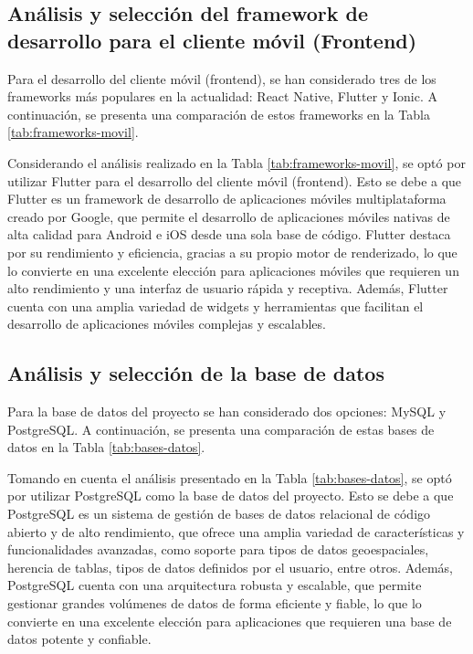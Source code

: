 \subsection{Análisis y selección del framework de desarrollo para el cliente móvil (Frontend)}

Para el desarrollo del cliente móvil (frontend), se han considerado tres de los frameworks más populares en la
actualidad: React Native, Flutter y Ionic. A continuación, se presenta una comparación de estos frameworks en la
Tabla \ref{tab:frameworks-movil}.



Considerando el análisis realizado en la Tabla \ref{tab:frameworks-movil}, se optó por utilizar Flutter para el
desarrollo del cliente móvil (frontend). Esto se debe a que Flutter es un framework de desarrollo de aplicaciones
móviles multiplataforma creado por Google, que permite el desarrollo de aplicaciones móviles nativas de alta
calidad para Android e iOS desde una sola base de código. Flutter destaca por su rendimiento y eficiencia, gracias
a su propio motor de renderizado, lo que lo convierte en una excelente elección para aplicaciones móviles que
requieren un alto rendimiento y una interfaz de usuario rápida y receptiva. Además, Flutter cuenta con una amplia
variedad de widgets y herramientas que facilitan el desarrollo de aplicaciones móviles complejas y escalables.

\subsection{Análisis y selección de la base de datos}

Para la base de datos del proyecto se han considerado dos opciones: MySQL y PostgreSQL. A continuación, se presenta
una comparación de estas bases de datos en la Tabla \ref{tab:bases-datos}.



Tomando en cuenta el análisis presentado en la Tabla \ref{tab:bases-datos}, se optó por utilizar PostgreSQL como
la base de datos del proyecto. Esto se debe a que PostgreSQL es un sistema de gestión de bases de datos relacional
de código abierto y de alto rendimiento, que ofrece una amplia variedad de características y funcionalidades
avanzadas, como soporte para tipos de datos geoespaciales, herencia de tablas, tipos de datos definidos por el
usuario, entre otros. Además, PostgreSQL cuenta con una arquitectura robusta y escalable, que permite gestionar
grandes volúmenes de datos de forma eficiente y fiable, lo que lo convierte en una excelente elección para
aplicaciones que requieren una base de datos potente y confiable.